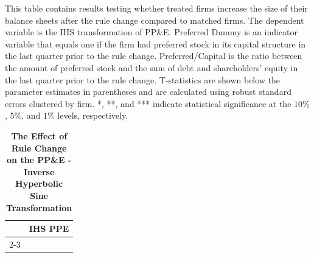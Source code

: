 \documentclass[a4paper, 12pt]{article}
\begin{document}
\begin{table}[htbp]
\caption{\textbf{The Effect of Rule Change on the PP\&E - Inverse Hyperbolic Sine Transformation}} \label{table_bs_sine}
\begin{singlespace}
\begin{small}

\noindent This table contains results testing whether treated firms increase the size of their balance sheets after the rule change compared to matched firms. The dependent variable is the IHS transformation of PP\&E. Preferred Dummy is an indicator variable that equals one if the firm had preferred stock in its capital structure in the last quarter prior to the rule change. Preferred/Capital is the ratio between the amount of preferred stock and the sum of debt and shareholders' equity in the last quarter prior to the rule change. T-statistics are shown below the parameter estimates in parentheses and are calculated using robust standard errors clustered by firm. *, **, and *** indicate statistical significance at the $10\%$, $5\%$, and $1\%$ levels, respectively.

\end{small}
\end{singlespace}
\vspace{3mm}
\small
  \centering
    \begin{tabular}{lcc}
    \toprule
    \textbf{ } &
      \multicolumn{2}{c}{\textbf{IHS PPE}}
      \\
      \cline{2-3}
  


    \bottomrule
    \end{tabular}
\end{table}
\clearpage

\newpage

\clearpage
\newpage
\end{document}
